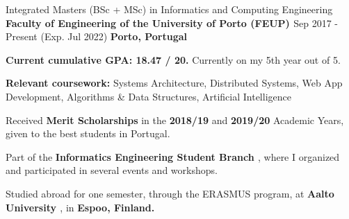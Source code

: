 

\begin{cventries}

  \cventry
    {Integrated Masters (BSc + MSc) in Informatics and Computing Engineering} %
    {\textbf{Faculty of Engineering of the University of Porto (FEUP) \href{https://sigarra.up.pt/feup/en/web_page.inicial}{\faExternalLink}}} %
    {Sep 2017 - Present (Exp. Jul 2022)} %
    {\textbf{Porto, Portugal}} %
    {
      \begin{cvitems} %
        \item {\textbf{Current cumulative GPA: 18.47 / 20.} Currently on my 5th year out of 5.}
        \item {\textbf{Relevant coursework:} Systems Architecture, Distributed Systems, Web App Development, Algorithms \& Data Structures, Artificial Intelligence}
        \item {Received \textbf{Merit Scholarships} in the \textbf{2018/19} and \textbf{2019/20} Academic Years, given to the best students in Portugal.}
        \item {Part of the \textbf{Informatics Engineering Student Branch \href{https://ni.fe.up.pt/}{\faExternalLink}}, where I organized and participated in several events and workshops.}
        \item{Studied abroad for one semester, through the ERASMUS program, at \textbf{Aalto University \href{https://www.aalto.fi/en}{\faExternalLink}}, in \textbf{Espoo, Finland.}}
      \end{cvitems}
    }
    

\end{cventries}
